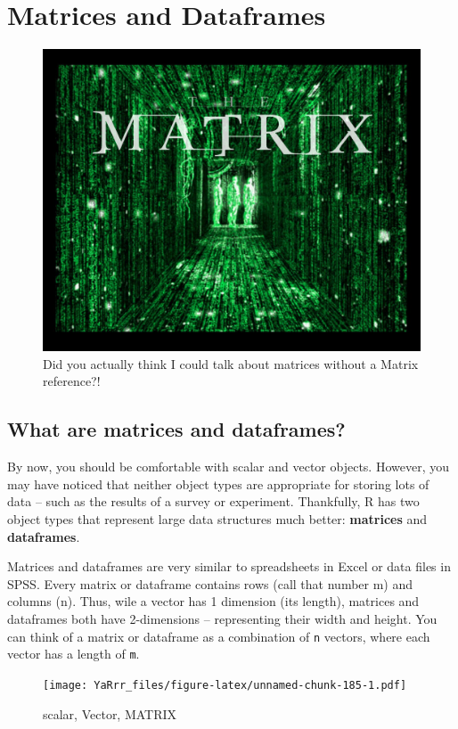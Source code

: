 \documentclass[]{book}
\theoremstyle{definition}
\theoremstyle{definition}
\theoremstyle{remark}
\begin{document}
\chapter{Matrices and Dataframes}\label{matricesdataframes}

\begin{figure}

{\centering \includegraphics[width=0.5\linewidth]{images/matrix} 

}

\caption{Did you actually think I could talk about matrices without a Matrix reference?!}\label{fig:unnamed-chunk-184}
\end{figure}

\section{What are matrices and
dataframes?}\label{what-are-matrices-and-dataframes}

By now, you should be comfortable with scalar and vector objects.
However, you may have noticed that neither object types are appropriate
for storing lots of data -- such as the results of a survey or
experiment. Thankfully, R has two object types that represent large data
structures much better: \textbf{matrices} and \textbf{dataframes}.

Matrices and dataframes are very similar to spreadsheets in Excel or
data files in SPSS. Every matrix or dataframe contains rows (call that
number m) and columns (n). Thus, wile a vector has 1 dimension (its
length), matrices and dataframes both have 2-dimensions -- representing
their width and height. You can think of a matrix or dataframe as a
combination of \texttt{n} vectors, where each vector has a length of
\texttt{m}.

\begin{figure}[htbp]
\centering
\texttt{[image: YaRrr\_files/figure-latex/unnamed-chunk-185-1.pdf]}
\caption{\label{fig:unnamed-chunk-185}scalar, Vector, MATRIX}
\end{figure}
\end{document}
